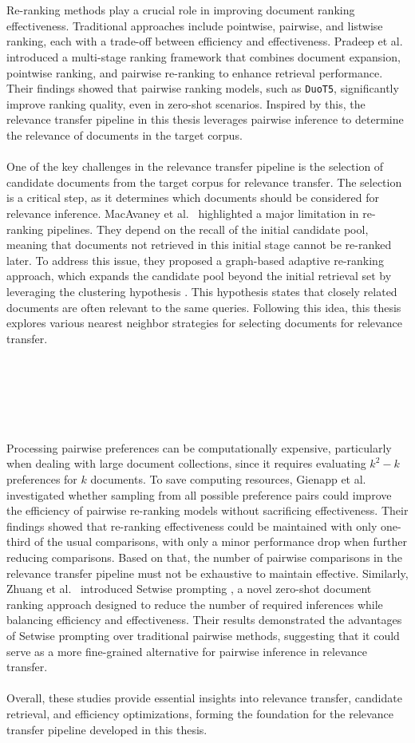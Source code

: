 \\\\
Re-ranking methods play a crucial role in improving document ranking effectiveness. Traditional approaches include pointwise, pairwise, and listwise ranking, each with a trade-off between efficiency and effectiveness. Pradeep et al.~\cite{pradeep:2021} introduced a multi-stage ranking framework that combines document expansion, pointwise ranking, and pairwise re-ranking to enhance retrieval performance. Their findings showed that pairwise ranking models, such as \texttt{DuoT5}, significantly improve ranking quality, even in zero-shot scenarios. Inspired by this, the relevance transfer pipeline in this thesis leverages pairwise inference to determine the relevance of documents in the target corpus.
\\\\
One of the key challenges in the relevance transfer pipeline is the selection of candidate documents from the target corpus for relevance transfer. The selection is a critical step, as it determines which documents should be considered for relevance inference. MacAvaney et al.~\cite{macavaney:2022} highlighted a major limitation in re-ranking pipelines. They depend on the recall of the initial candidate pool, meaning that documents not retrieved in this initial stage cannot be re-ranked later. To address this issue, they proposed a graph-based adaptive re-ranking approach, which expands the candidate pool beyond the initial retrieval set by leveraging the clustering hypothesis \mbox{\cite{jardine:1971}}. This hypothesis states that closely related documents are often relevant to the same queries. Following this idea, this thesis explores various nearest neighbor strategies for selecting documents for relevance transfer.
\\\\\\\\\\\\\\
Processing pairwise preferences can be computationally expensive, particularly when dealing with large document collections, since it requires evaluating $k^2-k$ preferences for $k$ documents. To save computing resources, Gienapp et al.~\cite{gienapp:2022} investigated whether sampling from all possible preference pairs could improve the efficiency of pairwise re-ranking models without sacrificing effectiveness. Their findings showed that re-ranking effectiveness could be maintained with only one-third of the usual comparisons, with only a minor performance drop when further reducing comparisons. Based on that, the number of pairwise comparisons in the relevance transfer pipeline must not be exhaustive to maintain effective. Similarly, Zhuang et al.~\cite{zhuang:2024} introduced \glqq Setwise prompting \grqq{}, a novel zero-shot document ranking approach designed to reduce the number of required inferences while balancing efficiency and effectiveness. Their results demonstrated the advantages of Setwise prompting over traditional pairwise methods, suggesting that it could serve as a more fine-grained alternative for pairwise inference in relevance transfer.
\\\\
Overall, these studies provide essential insights into relevance transfer, candidate retrieval, and efficiency optimizations, forming the foundation for the relevance transfer pipeline developed in this thesis.